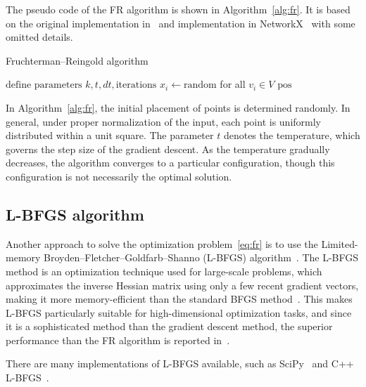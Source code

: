 \documentclass[dvipdfmx,journal]{IEEEtran}
\begin{document}
The pseudo code of the FR algorithm is shown in Algorithm~\ref{alg:fr}. It is based on the original implementation in~\cite{fruchtermanGraphDrawingForcedirected1991} and implementation in NetworkX~\cite{osti_960616} with some omitted details.

\begin{algorithm}[ht]
  \caption{Fruchterman--Reingold algorithm}
  \label{alg:fr}

  $\text{define parameters } k, t, dt, \text{iterations}$\;
  $x_i \gets \text{random}$ for all $v_i \in V$\;
  \Return $\text{pos}$
\end{algorithm}

In Algorithm~\ref{alg:fr}, the initial placement of points is determined randomly. In general, under proper normalization of the input, each point is uniformly distributed within a unit square.
The parameter $t$ denotes the temperature, which governs the step size of the gradient descent. As the temperature gradually decreases, the algorithm converges to a particular configuration, though this configuration is not necessarily the optimal solution.

\subsection{L-BFGS algorithm}\label{ssec:lbfgs}

Another approach to solve the optimization problem~\eqref{eq:fr} is to use the Limited-memory Broyden--Fletcher--Goldfarb--Shanno (L-BFGS) algorithm~\cite{6183577}.
The L-BFGS method is an optimization technique used for large-scale problems, which approximates the inverse Hessian matrix using only a few recent gradient vectors, making it more memory-efficient than the standard BFGS method~\cite{liuLimitedMemoryBFGS1989}.
This makes L-BFGS particularly suitable for high-dimensional optimization tasks, and since it is a sophisticated method than the gradient descent method, the superior performance than the FR algorithm is reported in~\cite{6183577}.

There are many implementations of L-BFGS available, such as SciPy~\cite{2020SciPy-NMeth} and C++ L-BFGS~\cite{qiuYixuanLBFGSpp2024,okazakiChokkanLiblbfgs2024}.
\end{document}
